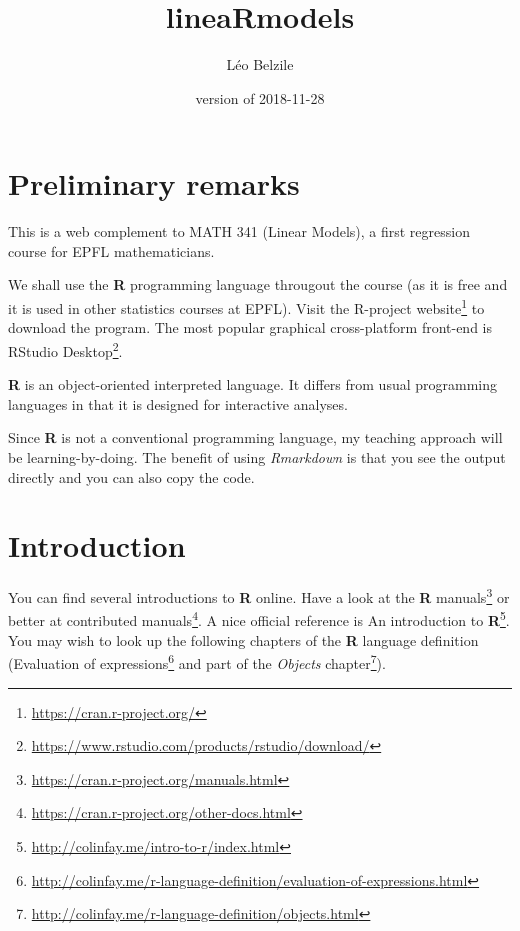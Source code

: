 \documentclass[]{book}
\title{lineaRmodels}
\author{Léo Belzile}
\date{version of 2018-11-28}
\let\rmarkdownfootnote\footnote%
\def\footnote{\protect\rmarkdownfootnote}
\renewcommand{\href}[2]{#2\footnote{\url{#1}}}
\theoremstyle{definition}
\theoremstyle{definition}
\theoremstyle{definition}
\theoremstyle{remark}
\begin{document}
\maketitle

{
\setcounter{tocdepth}{1}
\tableofcontents
}
\hypertarget{preliminary-remarks}{%
\chapter*{Preliminary remarks}\label{preliminary-remarks}}

This is a web complement to MATH 341 (Linear Models), a first regression
course for EPFL mathematicians.

We shall use the \textbf{R} programming language througout the course
(as it is free and it is used in other statistics courses at EPFL).
Visit \href{https://cran.r-project.org/}{the R-project website} to
download the program. The most popular graphical cross-platform
front-end is
\href{https://www.rstudio.com/products/rstudio/download/}{RStudio
Desktop}.

\textbf{R} is an object-oriented interpreted language. It differs from
usual programming languages in that it is designed for interactive
analyses.

Since \textbf{R} is not a conventional programming language, my teaching
approach will be learning-by-doing. The benefit of using
\emph{Rmarkdown} is that you see the output directly and you can also
copy the code.

\newcommand{\bs}[1]{\boldsymbol{#1}}
\newcommand{\Hmat}{\mathbf{H}}
\newcommand{\Mmat}{\mathbf{M}}
\newcommand{\mX}{\mathbf{X}}
\newcommand{\bX}{{\mathbf{X}}}
\newcommand{\bx}{{\mathbf{x}}}
\newcommand{\by}{{\boldsymbol{y}}}
\newcommand{\bY}{{\boldsymbol{Y}}}
\newcommand{\eps}{\varepsilon}
\newcommand{\beps}{\boldsymbol{\varepsilon}}
\newcommand{\bbeta}{\boldsymbol{\beta}}
\newcommand{\hbb}{\hat{\boldsymbol{\beta}}}
\newcommand{\limni}{\lim_{n \ra \infty}}
\newcommand{\Sp}{\mathscr{S}}
\newcommand{\E}[2][]{{\mathsf E}_{#1}\left(#2\right)}
\newcommand{\Va}[2][]{{\mathsf{Var}_{#1}}\left(#2\right)}
\newcommand{\I}[1]{{\mathbf 1}_{#1}}

\hypertarget{introduction}{%
\chapter{Introduction}\label{introduction}}

You can find several introductions to \textbf{R} online. Have a look at
the \href{https://cran.r-project.org/manuals.html}{\textbf{R} manuals}
or better at
\href{https://cran.r-project.org/other-docs.html}{contributed manuals}.
A nice official reference is
\href{http://colinfay.me/intro-to-r/index.html}{An introduction to
\textbf{R}}. You may wish to look up the following chapters of the
\textbf{R} language definition
(\href{http://colinfay.me/r-language-definition/evaluation-of-expressions.html}{Evaluation
of expressions} and part of the
\href{http://colinfay.me/r-language-definition/objects.html}{\emph{Objects}
chapter}).
\end{document}
